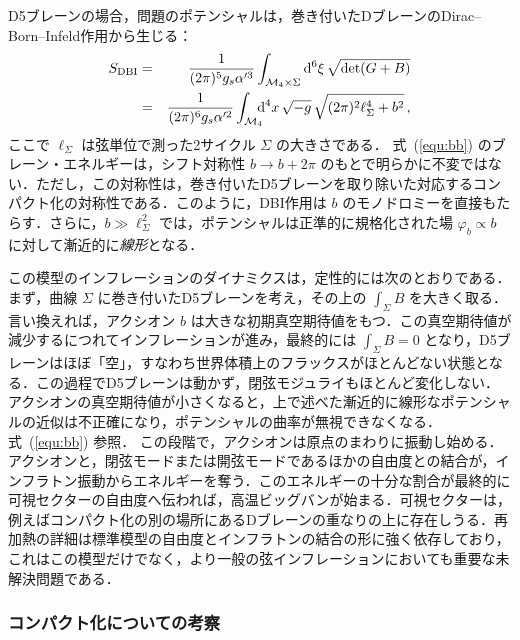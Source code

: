 D5ブレーンの場合，問題のポテンシャルは，巻き付いたDブレーンのDirac--Born--Infeld作用から生じる：
\begin{eqnarray}
S_{\rm DBI} &=& \frac{1}{(2\pi)^5 g_s \alpha'^3} \int_{{\cal M}_4 \times \Sigma}  {\rm d}^6 \xi \, \sqrt{\det(G+B)} \\
&=& \frac{1}{(2\pi)^6 g_s \alpha'^2} \int_{{\cal M}_4} \hskip -6pt {\rm d}^4 x\, \sqrt{-g} \, \sqrt{(2\pi)^2\ell_\Sigma^4 + b^2} \label{equ:bb}\, ,
\end{eqnarray}
ここで $\ell_\Sigma$ は弦単位で測った2サイクル $\Sigma$ の大きさである．
式~(\ref{equ:bb}) のブレーン・エネルギーは，シフト対称性 $b\to b +2\pi$ のもとで明らかに不変ではない．ただし，この対称性は，巻き付いたD5ブレーンを取り除いた対応するコンパクト化の対称性である．このように，DBI作用は $b$ のモノドロミーを直接もたらす．さらに，$b \gg \ell_\Sigma^2$ では，ポテンシャルは正準的に規格化された場 $\varphi_b \propto b$ に対して漸近的に{\it{線形}}となる．

\vskip 6pt
この模型のインフレーションのダイナミクスは，定性的には次のとおりである．まず，曲線 $\Sigma$ に巻き付いたD5ブレーンを考え，その上の $ \int_\Sigma B$ を大きく取る．言い換えれば，アクシオン $b$ は大きな初期真空期待値をもつ．この真空期待値が減少するにつれてインフレーションが進み，最終的には $\int_\Sigma B = 0$ となり，D5ブレーンはほぼ「空」，すなわち世界体積上のフラックスがほとんどない状態となる．この過程でD5ブレーンは動かず，閉弦モジュライもほとんど変化しない．アクシオンの真空期待値が小さくなると，上で述べた漸近的に線形なポテンシャルの近似は不正確になり，ポテンシャルの曲率が無視できなくなる．式~(\ref{equ:bb}) 参照．
この段階で，アクシオンは原点のまわりに振動し始める．アクシオンと，閉弦モードまたは開弦モードであるほかの自由度との結合が，インフラトン振動からエネルギーを奪う．このエネルギーの十分な割合が最終的に可視セクターの自由度へ伝われば，高温ビッグバンが始まる．可視セクターは，例えばコンパクト化の別の場所にあるDブレーンの重なりの上に存在しうる．再加熱の詳細は標準模型の自由度とインフラトンの結合の形に強く依存しており，これはこの模型だけでなく，より一般の弦インフレーションにおいても重要な未解決問題である．


\subsubsection{コンパクト化についての考察}

